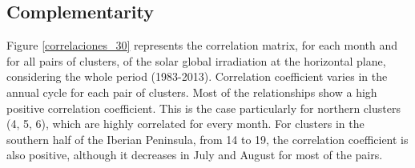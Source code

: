 


\subsection*{Complementarity}


Figure \ref{correlaciones_30} represents the correlation matrix, for each month and for all pairs of clusters, of the solar global irradiation at the horizontal plane, considering the whole period (1983-2013). Correlation coefficient varies in the annual cycle for each pair of clusters. Most of the relationships show a high positive correlation coefficient. This is the case particularly for northern clusters (4, 5, 6), which are highly correlated for every month. For clusters in the southern half of the Iberian Peninsula, from 14 to 19, the correlation coefficient is also positive, although it decreases in July and August for most of the pairs. 

